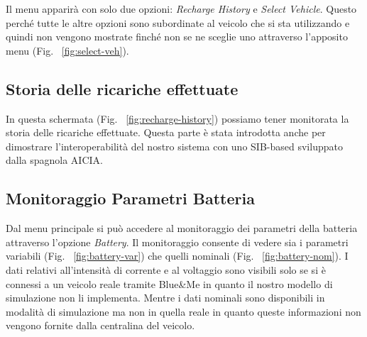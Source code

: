 Il menu apparirà con solo due opzioni: \emph{Recharge History} e \emph{Select Vehicle}. Questo perché tutte le altre opzioni sono subordinate al veicolo che si sta utilizzando e quindi non vengono mostrate finché non se ne sceglie uno attraverso l'apposito menu (Fig. ~\ref{fig:select-veh}). 

\subsection{Storia delle ricariche effettuate}

In questa schermata (Fig. ~\ref{fig:recharge-history}) possiamo tener monitorata la storia delle ricariche effettuate. Questa parte è stata introdotta anche per dimostrare l'interoperabilità del nostro sistema con uno SIB-based sviluppato dalla spagnola AICIA.

\subsection{Monitoraggio Parametri Batteria}

Dal menu principale si può accedere al monitoraggio dei parametri della batteria attraverso l'opzione \emph{Battery}. Il monitoraggio consente di vedere sia i parametri variabili (Fig. ~\ref{fig:battery-var}) che quelli nominali (Fig. ~\ref{fig:battery-nom}). I dati relativi all'intensità di corrente e al voltaggio sono visibili solo se si è connessi a un veicolo reale tramite Blue\&{}Me in quanto il nostro modello di simulazione non li implementa. Mentre i dati nominali sono disponibili in modalità di simulazione ma non in quella reale in quanto queste informazioni non vengono fornite dalla centralina del veicolo.

